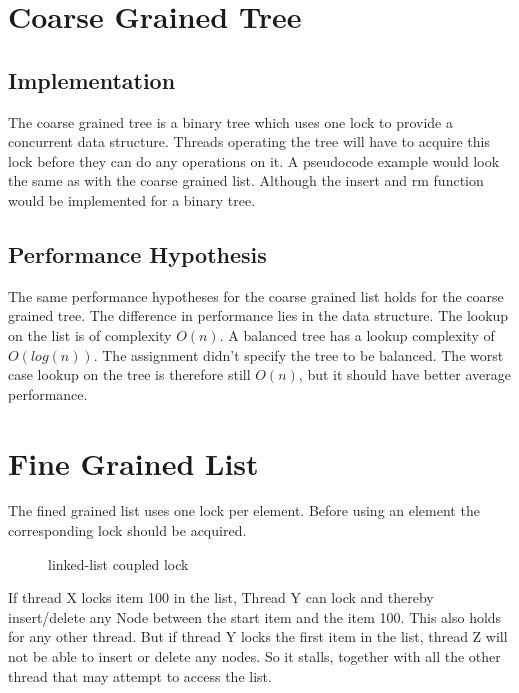 \documentclass[10pt,a4paper]{article}
\begin{document}
\section{Coarse Grained Tree}
\subsection{Implementation}
The coarse grained tree is a binary tree which uses one lock to provide a concurrent data structure. Threads operating the tree will have to acquire this lock before they can do any operations on it. A pseudocode example would look the same as with the coarse grained list. Although the insert and rm function would be implemented for a binary tree.

\subsection{Performance Hypothesis}
The same performance hypotheses for the coarse grained list holds for the coarse grained tree. The difference in performance lies in the data structure. The lookup on the list is of complexity $O(n)$. A balanced tree has a lookup complexity of $O(log(n))$. The assignment didn't specify the tree to be balanced. The worst case lookup on the tree is therefore still $O(n)$, but it should have better average performance.

\section{Fine Grained List}
The fined grained list uses one lock per element. Before using an element the corresponding lock should be acquired.

\begin{figure}[h]
\centerline{
}
\caption{linked-list coupled lock}
\end{figure}

If thread X locks item 100 in the list, Thread Y can lock and thereby
insert/delete any Node between the start item and the item 100. This
also holds for any other thread. But if thread Y locks the first item in the
list, thread Z will not be able to insert or delete any nodes. So it stalls,
together with all the other thread that may attempt to access the list.
\end{document}
